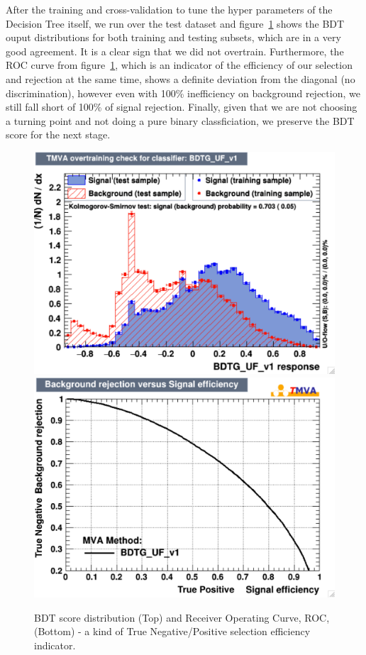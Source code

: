 After the training and cross-validation to tune the hyper parameters of the Decision Tree itself, we run over the test dataset and figure~\ref{fig:higgs_categorization_bdtoutputroc} shows the BDT ouput distributions for both training and testing subsets, which are in a very good agreement. It is a clear sign that we did not overtrain. Furthermore, the ROC curve from figure~\ref{fig:higgs_categorization_bdtoutputroc}, which is an indicator of the efficiency of our selection and rejection at the same time, shows a definite deviation from the diagonal (no discrimination), however even with 100\% inefficiency on background rejection, we still fall short of 100\% of signal rejection. Finally, given that we are not choosing a turning point and not doing a pure binary classficiation, we preserve the BDT score for the next stage.
\begin{figure}[hbp]
  \centering
  \includegraphics[width=0.75\linewidth]{figures/bdt_training/BDT_out_ge0j_all.pdf}\\
  \includegraphics[width=0.75\linewidth]{figures/bdt_training/BDT_ROC_ge0j_all.pdf}
  \caption{BDT score distribution (Top) and Receiver Operating Curve, ROC, (Bottom) - a kind of True Negative/Positive selection efficiency indicator.}
  \label{fig:higgs_categorization_bdtoutputroc}
\end{figure}

